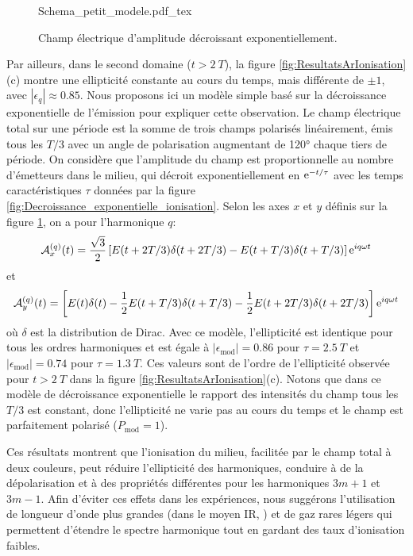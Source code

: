 \begin{figure}[h]
\centering
\def\svgwidth{0.5\textwidth}
{Schema_petit_modele.pdf_tex}
\caption{Champ électrique d'amplitude décroissant exponentiellement.}
\label{fig:Schema_petit_modele}
\end{figure}

Par ailleurs, dans le second domaine ($t > 2 \: T$), la figure \ref{fig:ResultatsArIonisation}(c) montre une ellipticité constante au cours du temps, mais différente de $\pm 1$, avec $|\epsilon_q| \approx 0.85$. Nous proposons ici un modèle simple basé sur la décroissance exponentielle de l'émission pour expliquer cette observation. Le champ électrique total sur une période est la somme de trois champs polarisés linéairement, émis tous les $T/3$ avec un angle de polarisation augmentant de 120° chaque tiers de période. On considère que l'amplitude du champ est proportionnelle au nombre d'émetteurs dans le milieu, qui décroit exponentiellement en $\mathrm{e}^{-t/\tau}$ avec les temps caractéristiques $\tau$ données par la figure \ref{fig:Decroissance_exponentielle_ionisation}. Selon les axes $x$ et $y$ définis sur la figure \ref{fig:Schema_petit_modele}, on a pour l'harmonique $q$:
\begin{equation}
\mathcal{A}_x^{(q)} (t) = \frac{\sqrt{3}}{2} \left[ E(t+2T/3) \delta(t+2T/3) - E(t+T/3) \delta(t+T/3) \right] \mathrm{e}^{iq\omega t}
\end{equation}
et
\begin{equation}
\mathcal{A}_y^{(q)} (t) = \left[ E(t) \delta(t) - \frac{1}{2} E(t+T/3) \delta(t+T/3) - \frac{1}{2} E(t+2T/3) \delta(t+2T/3) \right] \mathrm{e}^{iq\omega t}
\end{equation}
où $\delta$ est la distribution de Dirac. Avec ce modèle, l'ellipticité est identique pour tous les ordres harmoniques et est égale à $|\epsilon_{\text{mod}}| = 0.86$ pour $\tau = 2.5 \: T$ et $|\epsilon_{\text{mod}}| = 0.74$ pour $\tau = 1.3 \: T$. Ces valeurs sont de l'ordre de l'ellipticité observée pour $t > 2 \: T$ dans la figure \ref{fig:ResultatsArIonisation}(c). Notons que dans ce modèle de décroissance exponentielle le rapport des intensités du champ tous les $T/3$ est constant, donc l'ellipticité ne varie pas au cours du temps et le champ est parfaitement polarisé ($P_{\text{mod}} = 1$).

Ces résultats montrent que l'ionisation du milieu, facilitée par le champ total à deux couleurs, peut réduire l'ellipticité des harmoniques, conduire à de la dépolarisation et à des propriétés différentes pour les harmoniques $3m+1$ et $3m-1$. Afin d'éviter ces effets dans les expériences, nous suggérons l'utilisation de longueur d'onde plus grandes (dans le moyen IR, ) et de gaz rares légers qui permettent d'étendre le spectre harmonique tout en gardant des taux d'ionisation faibles.

